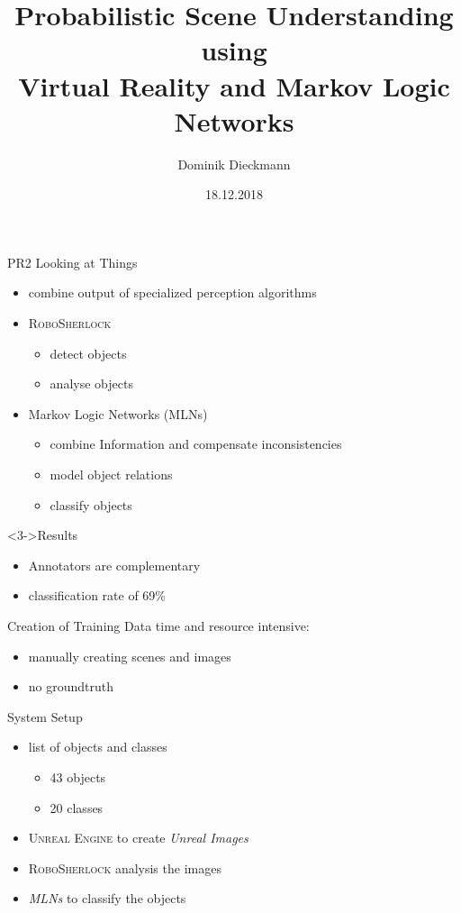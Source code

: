 \documentclass[]{beamer}
\title[Short version]{Probabilistic Scene Understanding using\\ Virtual Reality and Markov Logic Networks}
\subtitle[]{}
\date[]{18.12.2018}
\author[D. Dieckmann]{Dominik Dieckmann}
\institute[Uni Bremen]{Institute for Artificial Intelligence \\ University Bremen}
\begin{document}
\beamertemplatenavigationsymbolsempty

\begin{frame}
	\maketitle
\end{frame}

\begin{frame}{PR2 Looking at Things}
	\begin{itemize}
		\item<1-> combine output of specialized perception algorithms 
		\item<2-> \textsc{RoboSherlock}
			\begin{itemize}
				\item detect objects
				\item analyse objects
			\end{itemize}
		\item<2-> Markov Logic Networks (MLNs)
			\begin{itemize}
				\item combine Information and compensate inconsistencies
				\item model object relations
				\item classify objects
			\end{itemize}
	\end{itemize}
	\bigskip
	\begin{block}<3->{Results}
		\begin{itemize}
			\item Annotators are complementary
			\item classification rate of 69\%
		\end{itemize}
	\end{block}
\end{frame}

\begin{frame}{Creation of Training Data}
time and resource intensive:
	\begin{itemize}
		\item manually creating scenes and images
		\item no groundtruth
	\end{itemize}
	\bigskip
{}
\end{frame}

\begin{frame}{System Setup}
	\begin{itemize}
		\item list of objects and classes
			\begin{itemize}
				\item 43 objects
				\item 20 classes
			\end{itemize}
		\item \textsc{Unreal Engine} to create \textit{Unreal Images}
		\item \textsc{RoboSherlock} analysis the images
		\item \textit{MLNs} to classify the objects
	\end{itemize}
\end{frame}
\end{document}
